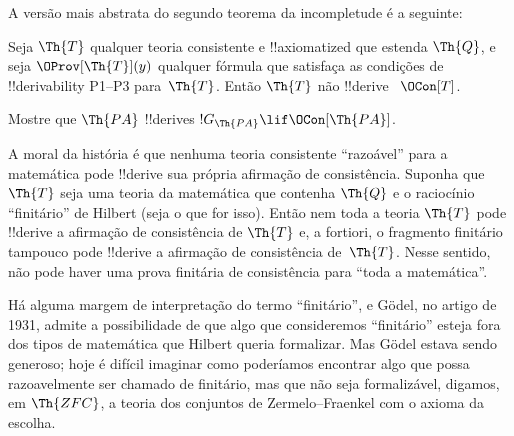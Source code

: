 \documentclass[../../../include/open-logic-section]{subfiles}
\begin{document}
A versão mais abstrata do segundo teorema da incompletude é a seguinte:

\begin{thm}
 Seja $\Th{T}$ qualquer teoria
consistente e !!{axiomatized} que estenda $\Th{Q}$, e seja
$\OProv[\Th{T}](y)$ qualquer fórmula que satisfaça as condições de
!!{derivability} P1--P3 para~$\Th{T}$. Então $\Th{T}$ não !!{derive}
~$\OCon[T]$.
\end{thm}

\begin{prob}
Mostre que $\Th{PA}$ !!{derive}s $!G_{\Th{PA}} \lif \OCon[\Th{PA}]$.
\end{prob}

\begin{digress}
A moral da história é que nenhuma teoria consistente ``razoável'' para a
matemática pode !!{derive} sua própria afirmação de consistência. Suponha que
$\Th{T}$ seja uma teoria da matemática que contenha $\Th{Q}$ e o raciocínio
``finitário'' de Hilbert (seja o que for isso). Então nem toda a teoria
$\Th{T}$ pode !!{derive} a afirmação de consistência de $\Th{T}$ e,
a fortiori, o fragmento finitário tampouco pode !!{derive} a
afirmação de consistência de~$\Th{T}$. Nesse sentido, não pode haver uma
prova finitária de consistência para ``toda a matemática''.

Há alguma margem de interpretação do termo ``finitário'', e G\"odel, no
artigo de 1931, admite a possibilidade de que algo que consideremos
``finitário'' esteja fora dos tipos de matemática que Hilbert queria
formalizar. Mas G\"odel estava sendo generoso; hoje é difícil imaginar como
poderíamos encontrar algo que possa razoavelmente ser chamado de finitário,
mas que não seja formalizável, digamos, em $\Th{ZFC}$, a teoria dos conjuntos
de Zermelo--Fraenkel com o axioma da escolha.
\end{digress}
\end{document}
